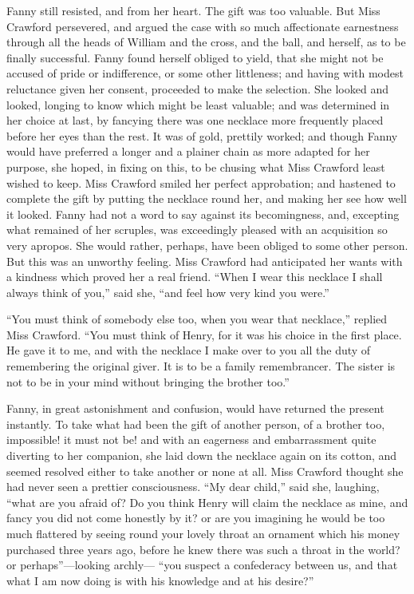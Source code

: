 Fanny still resisted, and from her heart.  The gift was
too valuable.  But Miss Crawford persevered, and argued
the case with so much affectionate earnestness through
all the heads of William and the cross, and the ball,
and herself, as to be finally successful.  Fanny found
herself obliged to yield, that she might not be accused
of pride or indifference, or some other littleness;
and having with modest reluctance given her consent,
proceeded to make the selection.  She looked and looked,
longing to know which might be least valuable; and was
determined in her choice at last, by fancying there was
one necklace more frequently placed before her eyes than
the rest.  It was of gold, prettily worked; and though Fanny
would have preferred a longer and a plainer chain as more
adapted for her purpose, she hoped, in fixing on this,
to be chusing what Miss Crawford least wished to keep.
Miss Crawford smiled her perfect approbation; and hastened
to complete the gift by putting the necklace round her,
and making her see how well it looked.  Fanny had not a
word to say against its becomingness, and, excepting what
remained of her scruples, was exceedingly pleased with an
acquisition so very apropos.  She would rather, perhaps,
have been obliged to some other person.  But this was
an unworthy feeling.  Miss Crawford had anticipated her
wants with a kindness which proved her a real friend.
``When I wear this necklace I shall always think of you,''
said she, ``and feel how very kind you were.''

``You must think of somebody else too, when you wear
that necklace,'' replied Miss Crawford.  ``You must think
of Henry, for it was his choice in the first place.
He gave it to me, and with the necklace I make over
to you all the duty of remembering the original giver.
It is to be a family remembrancer.  The sister is not to be
in your mind without bringing the brother too.''

Fanny, in great astonishment and confusion, would have
returned the present instantly.  To take what had
been the gift of another person, of a brother too,
impossible! it must not be! and with an eagerness and
embarrassment quite diverting to her companion, she laid
down the necklace again on its cotton, and seemed resolved
either to take another or none at all.  Miss Crawford
thought she had never seen a prettier consciousness.
``My dear child,'' said she, laughing, ``what are you afraid of?
Do you think Henry will claim the necklace as mine,
and fancy you did not come honestly by it? or are you
imagining he would be too much flattered by seeing
round your lovely throat an ornament which his money
purchased three years ago, before he knew there was such
a throat in the world? or perhaps''---looking archly---%
``you suspect a confederacy between us, and that what
I am now doing is with his knowledge and at his desire?''

